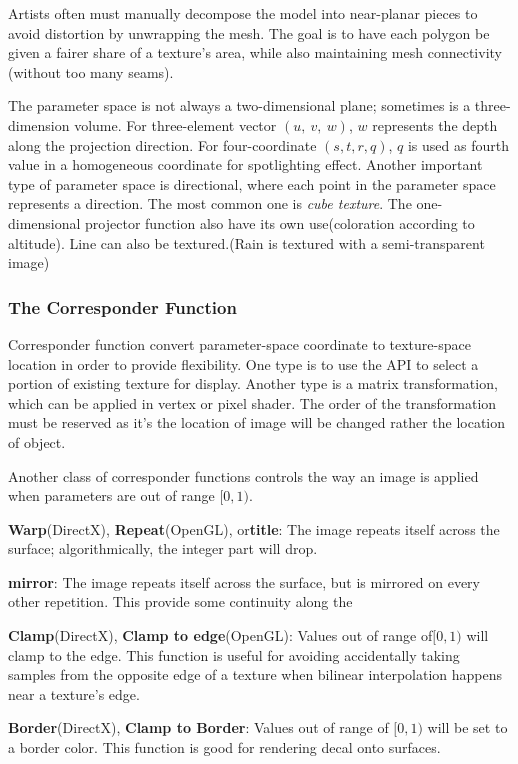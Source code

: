 \documentclass[10pt, a4paper]{article}
\begin{document}
        Artists often must manually decompose the model into near-planar pieces to avoid distortion by unwrapping the mesh. The goal is to have each polygon be given a fairer share of a texture's area, while also maintaining mesh connectivity (without too many seams).
        
        The parameter space is not always a two-dimensional plane; sometimes is a three-dimension volume. For three-element vector $(u,\ v,\ w)$, $w$ represents the depth along the projection direction. For four-coordinate $(s, t, r, q)$, $q$ is used as fourth value in a homogeneous coordinate for spotlighting effect. Another important type of parameter space is directional, where each point in the parameter space represents a direction. The most common one is \emph{cube texture}. The one-dimensional projector function also have its own use(coloration according to altitude). Line can also be textured.(Rain is textured with a semi-transparent image)

    \subsubsection{The Corresponder Function}
        Corresponder function convert parameter-space coordinate to texture-space location in order to provide flexibility. One type is to use the API to select a portion of existing texture for display. Another type is a matrix transformation, which can be applied in vertex or pixel shader. The order of the transformation must be reserved as it's the location of image  will be changed rather the location of object. 

        Another class of corresponder functions controls the way an image is applied when parameters are out of range $[0, 1)$.

        \textbf{Warp}(DirectX), \textbf{Repeat}(OpenGL), or\textbf{title}: The image repeats itself across the surface; algorithmically, the integer part will drop. 
        
        \textbf{mirror}: The image repeats itself across the surface, but is mirrored on every other repetition. This provide some continuity along the 

        \textbf{Clamp}(DirectX), \textbf{Clamp to edge}(OpenGL): Values out of range of$[0, 1)$ will clamp to the edge. This function is useful for avoiding accidentally taking samples from the opposite edge of a texture when bilinear interpolation happens near a texture's edge. 

        \textbf{Border}(DirectX), \textbf{Clamp to Border}: Values out of range of $[0, 1)$ will be set to a border color. This function is good for rendering decal onto surfaces. 
\end{document}
